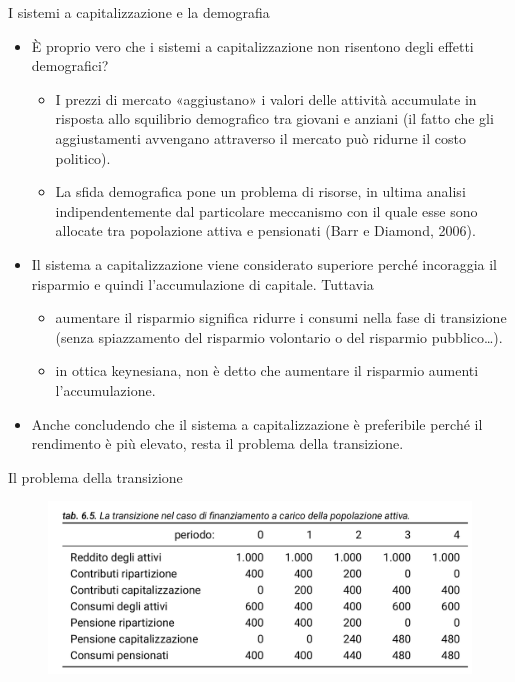 \documentclass[aspectratio=64,12pt]{beamer}
\begin{document}
\begin{frame}{I sistemi a capitalizzazione e la demografia}
\begin{itemize}
\item È proprio vero che i sistemi a capitalizzazione non risentono degli effetti
demografici?
\begin{itemize}
\item I prezzi di mercato «aggiustano» i valori delle attività accumulate in
  risposta allo squilibrio demografico tra giovani e anziani (il fatto che gli
  aggiustamenti avvengano attraverso il mercato può ridurne il costo politico).
\item La sfida demografica pone un problema di risorse, in ultima analisi
  indipendentemente dal particolare meccanismo con il quale esse sono allocate
  tra popolazione attiva e pensionati (Barr e Diamond, 2006).
\end{itemize}
\item Il sistema a capitalizzazione viene considerato superiore perché incoraggia
il risparmio e quindi l'accumulazione di capitale. Tuttavia
\begin{itemize}
\item aumentare il risparmio significa ridurre i consumi nella fase di
transizione (senza spiazzamento del risparmio volontario o del
risparmio pubblico\ldots{}).
\item in ottica keynesiana, non è detto che aumentare il risparmio aumenti
l'accumulazione.
\end{itemize}
\item Anche concludendo che il sistema a capitalizzazione è preferibile perché il
rendimento è più elevato, resta il problema della \alert{transizione}.
\end{itemize}
\end{frame}

\begin{frame}{Il problema della transizione}
\begin{figure}[htbp]
\centering
\includegraphics[width=\textwidth]{./figure/transizione-alla-capitalizzazione-1.png}
\end{figure}
\end{frame}
\end{document}
